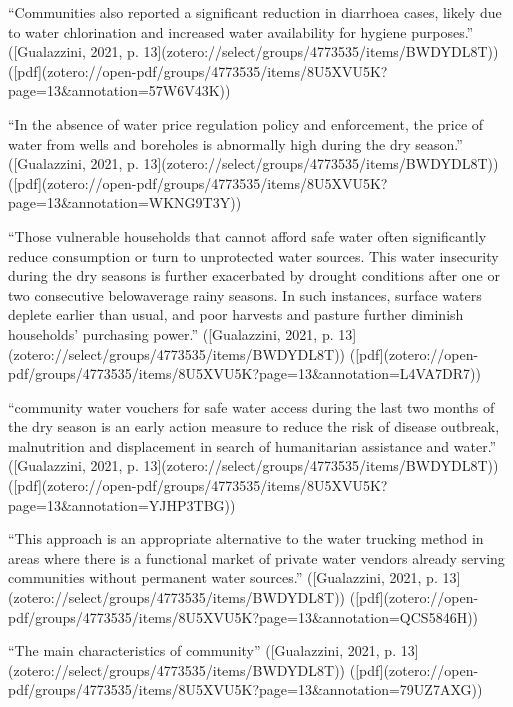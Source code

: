 {“Communities also reported a significant reduction in diarrhoea cases, likely due to water chlorination and increased water availability for hygiene purposes.” ([Gualazzini, 2021, p. 13](zotero://select/groups/4773535/items/BWDYDL8T)) ([pdf](zotero://open-pdf/groups/4773535/items/8U5XVU5K?page=13&annotation=57W6V43K))

“In the absence of water price regulation policy and enforcement, the price of water from wells and boreholes is abnormally high during the dry season.” ([Gualazzini, 2021, p. 13](zotero://select/groups/4773535/items/BWDYDL8T)) ([pdf](zotero://open-pdf/groups/4773535/items/8U5XVU5K?page=13&annotation=WKNG9T3Y))

“Those vulnerable households that cannot afford safe water often significantly reduce consumption or turn to unprotected water sources. This water insecurity during the dry seasons is further exacerbated by drought conditions after one or two consecutive belowaverage rainy seasons. In such instances, surface waters deplete earlier than usual, and poor harvests and pasture further diminish households’ purchasing power.” ([Gualazzini, 2021, p. 13](zotero://select/groups/4773535/items/BWDYDL8T)) ([pdf](zotero://open-pdf/groups/4773535/items/8U5XVU5K?page=13&annotation=L4VA7DR7))

“community water vouchers for safe water access during the last two months of the dry season is an early action measure to reduce the risk of disease outbreak, malnutrition and displacement in search of humanitarian assistance and water.” ([Gualazzini, 2021, p. 13](zotero://select/groups/4773535/items/BWDYDL8T)) ([pdf](zotero://open-pdf/groups/4773535/items/8U5XVU5K?page=13&annotation=YJHP3TBG))

“This approach is an appropriate alternative to the water trucking method in areas where there is a functional market of private water vendors already serving communities without permanent water sources.” ([Gualazzini, 2021, p. 13](zotero://select/groups/4773535/items/BWDYDL8T)) ([pdf](zotero://open-pdf/groups/4773535/items/8U5XVU5K?page=13&annotation=QCS5846H))

“The main characteristics of community” ([Gualazzini, 2021, p. 13](zotero://select/groups/4773535/items/BWDYDL8T)) ([pdf](zotero://open-pdf/groups/4773535/items/8U5XVU5K?page=13&annotation=79UZ7AXG))

}
